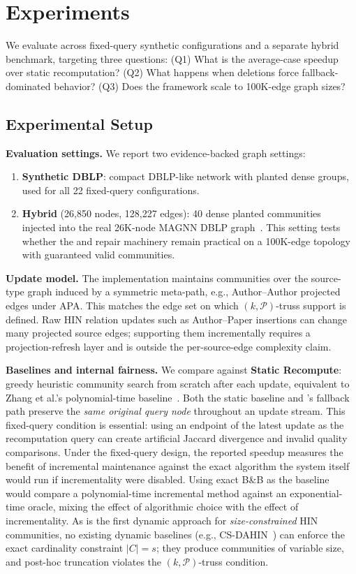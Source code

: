 \section{Experiments}

We evaluate \DynaSCSH across fixed-query synthetic configurations and a separate hybrid benchmark, targeting three questions: (Q1) What is the average-case speedup over static recomputation? (Q2) What happens when deletions force fallback-dominated behavior? (Q3) Does the framework scale to 100K-edge graph sizes?

\subsection{Experimental Setup}
\label{sec:setup}

\textbf{Evaluation settings.} We report two evidence-backed graph settings:
\begin{enumerate}
\item \textbf{Synthetic DBLP}: compact DBLP-like network with planted dense groups, used for all 22 fixed-query configurations.
\item \textbf{Hybrid} (26,850 nodes, 128,227 edges): 40 dense planted communities injected into the real 26K-node MAGNN DBLP graph~\cite{fu2020magnn}. This setting tests whether the \mtindex and repair machinery remain practical on a 100K-edge topology with guaranteed valid communities.
\end{enumerate}

\textbf{Update model.} The implementation maintains communities over the source-type graph induced by a symmetric meta-path, e.g., Author--Author projected edges under APA. This matches the edge set on which $(k,\mathcal{P})$-truss support is defined. Raw HIN relation updates such as Author--Paper insertions can change many projected source edges; supporting them incrementally requires a projection-refresh layer and is outside the per-source-edge complexity claim.

\textbf{Baselines and internal fairness.} We compare against \textbf{Static Recompute}: greedy heuristic community search from scratch after each update, equivalent to Zhang et al.'s polynomial-time baseline~\cite{zhang2025scsh}. Both the static baseline and \DynaSCSH's fallback path preserve the \emph{same original query node} throughout an update stream. This fixed-query condition is essential: using an endpoint of the latest update as the recomputation query can create artificial Jaccard divergence and invalid quality comparisons. Under the fixed-query design, the reported speedup measures the benefit of incremental maintenance against the exact algorithm the system itself would run if incrementality were disabled. Using exact B\&B as the baseline would compare a polynomial-time incremental method against an exponential-time oracle, mixing the effect of algorithmic choice with the effect of incrementality. As \DynaSCSH is the first dynamic approach for \emph{size-constrained} HIN communities, no existing dynamic baselines (e.g., CS-DAHIN~\cite{song2024tkde}) can enforce the exact cardinality constraint $|C|=s$; they produce communities of variable size, and post-hoc truncation violates the $(k,\mathcal{P})$-truss condition.

